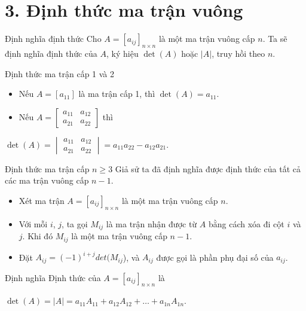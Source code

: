 \documentclass[pdf,10pt]{beamer}
\begin{document}
\section{3. Định thức ma trận vuông}
\begin{frame}{Định nghĩa định thức}
	Cho $A = [a_{ij}]_{n \times n}$ là một ma trận vuông cấp $n$. Ta sẽ định nghĩa định thức của $A$, ký hiệu $\det(A)$ hoặc $|A|$, truy hồi theo $n$.
	\begin{block}{Định thức ma trận cấp 1 và 2}
		\begin{itemize}
			\item Nếu $A =[a_{11}]$ là ma trận cấp 1, thì $\det(A)=a_{11}$.
			\\[5mm]
			\item Nếu $A = 
			\begin{bmatrix}
				a_{11} & a_{12} \\
				a_{21} & a_{22}
			\end{bmatrix} $
			thì\\[5mm]
		\end{itemize}
		\centerline{
			$\det(A)=
			\begin{vmatrix}
				a_{11} & a_{12} \\
				a_{21} & a_{22}
			\end{vmatrix}
			= a_{11}a_{22} - a_{12}a_{21}.$
		}
	\end{block}
	
\end{frame}

\begin{frame}{Định thức ma trận cấp $n \geq 3$}
	Giả sử ta đã định nghĩa được định thức của tất cả các ma trận vuông cấp $n - 1$.
	\begin{itemize}
		\item Xét ma trận $A = [a_{ij}]_{n \times n}$ là một ma trận vuông cấp $n$.
		\item Với mỗi $i$, $j$, ta gọi $M_{ij}$ là ma trận nhận được từ $A$ bằng cách xóa đi cột $i$ và $j$. Khi đó $M_{ij}$ là một ma trận vuông cấp $n-1$.
		\item Đặt $A_{ij}=(-1)^{i+j}det(M_{ij}$), và $A_{ij}$ được gọi là phần phụ đại số của $a_{ij}$.
	\end{itemize}
	\begin{block}{Định nghĩa}
		Định thức của $A=[a_{ij}]_{n \times n}$ là
		\\[5mm]
		\centerline{ $\det(A)=|A|=a_{11}A_{11}+a_{12}A_{12}+\dots+ a_{1n}A_{1n}.$ }
	\end{block}
\end{frame}
\end{document}
